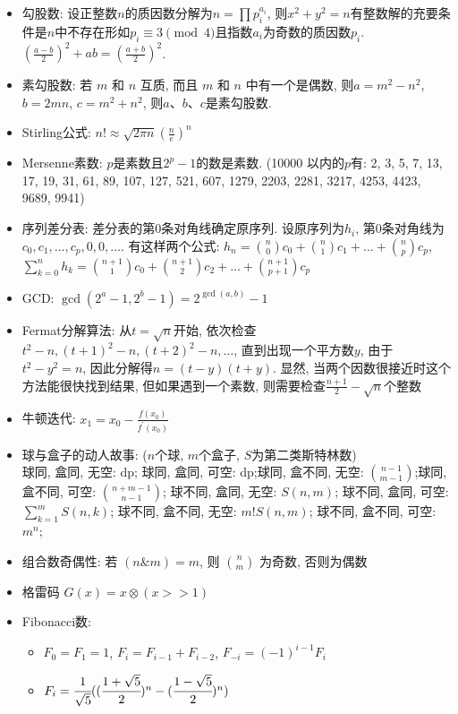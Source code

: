 \documentclass[landscape,a4paper]{article}
\begin{document}
\begin{spacing}{0.3}
\begin{multicols}{2}
\begin{itemize}
\item 勾股数: 设正整数$n$的质因数分解为$n = \prod p_i ^ {a_i}$,
  则$x^2+y^2=n$有整数解的充要条件是$n$中不存在形如$p_i \equiv 3\pmod{4}$且指数$a_i$为奇数的质因数$p_i$.
  $(\frac{a - b}{2})^2 + ab = (\frac{a + b}{2})^2$.
\item 素勾股数: 若 $m$ 和 $n$ 互质, 而且 $m$ 和 $n$ 中有一个是偶数, 则$a = m^2 - n^2$, $b = 2mn$, $c = m^2 + n^2$, 则$a$、$b$、$c$是素勾股数.
\item Stirling公式: $n! \approx \sqrt{2 \pi n} (\frac{n}{e})^n$
\item Mersenne素数: $p$是素数且$2^p-1$的数是素数. (10000 以内的$p$有: 2, 3, 5, 7, 13, 17, 19, 31, 61, 89, 107, 127, 521, 607, 1279, 2203, 2281, 3217, 4253, 4423, 9689, 9941)
\item 序列差分表: 差分表的第$0$条对角线确定原序列.
  设原序列为$h_i$, 第$0$条对角线为$c_0,c_1,\ldots,c_p,0,0,\ldots$.
  有这样两个公式:
  $h_n = \binom{n}{0}c_0 + \binom{n}{1}c_1 + \ldots + \binom{n}{p} c_p$,
  $\sum_{k = 0}^{n}h_k = \binom{n+1}{1}c_0 + \binom{n+1}{2}c_2 + \ldots + \binom{n+1}{p+1}c_p$
\item GCD:
  $\gcd(2^a-1,2^b-1)=2^{\gcd(a,b)}-1$
\item Fermat分解算法:
  从$t=\sqrt{n}$开始,
  依次检查$t^2-n,(t+1)^2-n,(t+2)^2-n,\ldots$,
  直到出现一个平方数$y$,
  由于$t ^ 2 - y ^ 2 = n$,
  因此分解得$n = (t -y)(t + y)$.
  显然, 当两个因数很接近时这个方法能很快找到结果,
  但如果遇到一个素数, 则需要检查$\frac{n + 1}{2} - \sqrt{n}$个整数
\item 牛顿迭代:
  $x_1 = x_0 - \frac{f(x_0)}{f^\prime(x_0)}$
\item 球与盒子的动人故事: ($n$个球, $m$个盒子, $S$为第二类斯特林数)\\
 球同, 盒同, 无空: dp; 球同, 盒同, 可空: dp;球同, 盒不同, 无空: $\binom{n - 1}{m - 1}$;球同, 盒不同, 可空: $\binom{n + m - 1}{n - 1}$;
      球不同, 盒同, 无空: $S(n, m)$;
      球不同, 盒同, 可空: $\sum_{k = 1}^{m} S(n, k)$;
      球不同, 盒不同, 无空: $m! S(n, m)$;
      球不同, 盒不同, 可空: $m^n$;
\item 组合数奇偶性: 若 $(n \& m) = m$, 则 $\binom{n}{m}$ 为奇数, 否则为偶数
\item 格雷码 $G(x) = x \otimes (x >> 1) $
\item Fibonacci数:
  \begin{itemize}
  \item $F_0 = F_1 = 1$, $F_i = F_{i - 1} + F_{i - 2}$, $F_{-i} = (-1) ^ {i - 1} F_i$
  \item $F_i = \cfrac{1}{\sqrt{5}} ((\cfrac{1 + \sqrt{5}}{2}) ^ n - (\cfrac{1 - \sqrt{5}}{2}) ^ {n}) $

\end{itemize}
\end{itemize}
\end{multicols}
\end{spacing}
\end{document}
